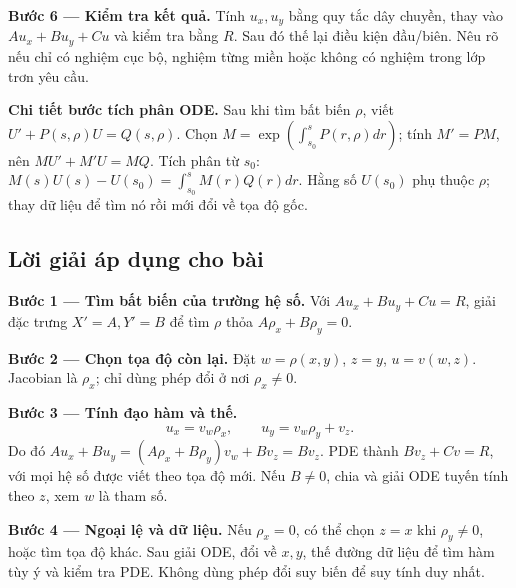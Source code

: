 \documentclass[10pt,a4paper]{article}
\begin{document}
\textbf{Bước 6 — Kiểm tra kết quả.} Tính $u_x,u_y$ bằng quy tắc dây chuyền, thay vào $Au_x+Bu_y+Cu$ và kiểm tra bằng $R$. Sau đó thế lại điều kiện đầu/biên. Nêu rõ nếu chỉ có nghiệm cục bộ, nghiệm từng miền hoặc không có nghiệm trong lớp trơn yêu cầu.

\textbf{Chi tiết bước tích phân ODE.} Sau khi tìm bất biến $\rho$, viết $U'+P(s,\rho)U=Q(s,\rho)$. Chọn $M=\exp(\int_{s_0}^{s}P(r,\rho)dr)$; tính $M'=PM$, nên $MU'+M'U=MQ$. Tích phân từ $s_0$: $M(s)U(s)-U(s_0)=\int_{s_0}^sM(r)Q(r)dr$. Hằng số $U(s_0)$ phụ thuộc $\rho$; thay dữ liệu để tìm nó rồi mới đổi về tọa độ gốc.
\subsection*{Lời giải áp dụng cho bài}
\textbf{Bước 1 — Tìm bất biến của trường hệ số.} Với $Au_x+Bu_y+Cu=R$, giải đặc trưng $X'=A,Y'=B$ để tìm $\rho$ thỏa $A\rho_x+B\rho_y=0$.

\textbf{Bước 2 — Chọn tọa độ còn lại.} Đặt $w=\rho(x,y)$, $z=y$, $u=v(w,z)$. Jacobian là $\rho_x$; chỉ dùng phép đổi ở nơi $\rho_x\ne0$.

\textbf{Bước 3 — Tính đạo hàm và thế.}
\[u_x=v_w\rho_x,\qquad u_y=v_w\rho_y+v_z.\]
Do đó $Au_x+Bu_y=(A\rho_x+B\rho_y)v_w+Bv_z=Bv_z$. PDE thành $Bv_z+Cv=R$, với mọi hệ số được viết theo tọa độ mới. Nếu $B\ne0$, chia và giải ODE tuyến tính theo $z$, xem $w$ là tham số.

\textbf{Bước 4 — Ngoại lệ và dữ liệu.} Nếu $\rho_x=0$, có thể chọn $z=x$ khi $\rho_y\ne0$, hoặc tìm tọa độ khác. Sau giải ODE, đổi về $x,y$, thế đường dữ liệu để tìm hàm tùy ý và kiểm tra PDE. Không dùng phép đổi suy biến để suy tính duy nhất.
\end{document}
